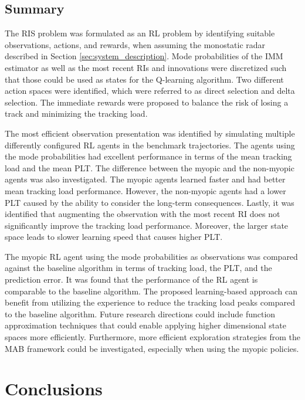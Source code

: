 \documentclass[english, 12pt, a4paper, elec, utf8, a-1b, online]{aaltothesis}
\begin{document}
\subsection{Summary}

The RIS problem was formulated as an RL problem by identifying suitable observations, actions, and rewards, when assuming the monostatic radar described in Section \ref{sec:system_description}.
Mode probabilities of the IMM estimator as well as the most recent RIs and innovations were discretized such that those could be used as states for the Q-learning algorithm.
Two different action spaces were identified, which were referred to as direct selection and delta selection.
The immediate rewards were proposed to balance the risk of losing a track and minimizing the tracking load.  

The most efficient observation presentation was identified by simulating multiple differently configured  RL agents in the benchmark trajectories.
The agents using the mode probabilities had excellent performance in terms of the mean tracking load and the mean PLT.
The difference between the myopic and the non-myopic agents was also investigated.
The myopic agents learned faster and had better mean tracking load performance.
However, the non-myopic agents had a lower PLT caused by the ability to consider the long-term consequences. 
Lastly, it was identified that augmenting the observation with the most recent RI does not significantly improve the tracking load performance.
Moreover, the larger state space leads to slower learning speed that causes higher PLT.  

The myopic RL agent using the mode probabilities as observations was compared against the baseline algorithm in terms of tracking load, the PLT, and the prediction error.
It was found that the performance of the RL agent is comparable to the baseline algorithm.
The proposed learning-based approach can benefit from utilizing the experience to reduce the tracking load peaks compared to the baseline algorithm.
Future research directions could include function approximation techniques that could enable applying higher dimensional state spaces more efficiently. 
Furthermore, more efficient exploration strategies from the MAB framework could be investigated, especially when using the myopic policies.


\clearpage
\section{Conclusions} \label{sec:conclusions}
\end{document}

